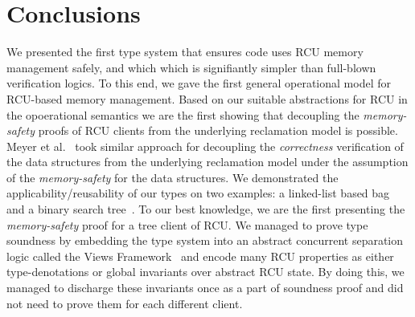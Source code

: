 \section{Conclusions}
\label{sec:concls}
We presented the first type system that ensures code uses RCU memory management safely, and which which is signifiantly simpler than full-blown verification logics. To this end, we gave the first general operational model for RCU-based memory management. Based on our suitable abstractions for RCU in the opoerational semantics we are the first showing that decoupling the \textit{memory-safety} proofs of RCU clients from the underlying reclamation model is possible. Meyer et al.~\cite{myr} took similar approach for decoupling the \textit{correctness} verification of the data structures from the underlying reclamation model under the assumption of the \textit{memory-safety} for the data structures. We demonstrated the applicability/reusability of our types on two examples: a linked-list based bag~\cite{McKenney2015SomeEO} and a binary search tree~\cite{Arbel:2014:CUR:2611462.2611471}. To our best knowledge, we are the first presenting the \textit{memory-safety} proof for a tree client of RCU. We managed to prove type soundness by embedding the type system into an abstract concurrent separation logic called the Views Framework~\cite{views} and encode many RCU properties as either type-denotations or global invariants over abstract RCU state. By doing this, we managed to discharge these invariants once as a part of soundness proof and did not need to prove them for each different client.
